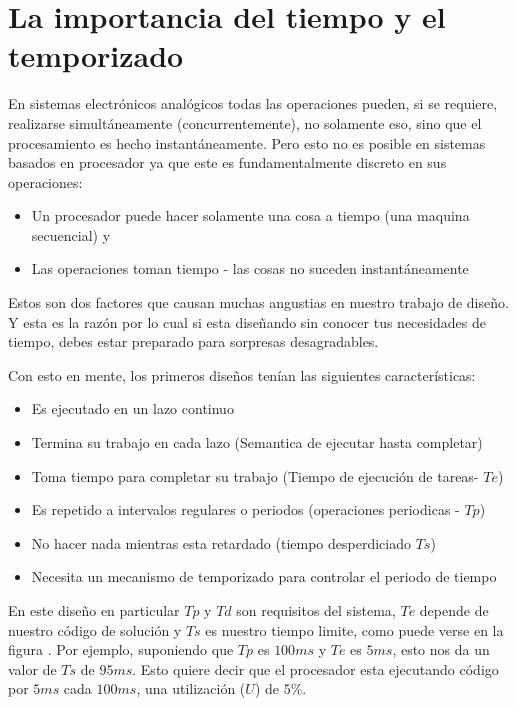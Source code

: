 \documentclass[12pt, twoside]{report}
\begin{document}

\section{La importancia del tiempo y el temporizado}
En sistemas electrónicos analógicos todas las operaciones pueden, si se requiere, realizarse simultáneamente (concurrentemente), no solamente eso, sino que el procesamiento es hecho instantáneamente. Pero esto no es posible en sistemas basados en procesador ya que este es fundamentalmente discreto en sus operaciones:

\begin{itemize}
	\item Un procesador puede hacer solamente una cosa a tiempo (una maquina secuencial) y
	\item Las operaciones toman tiempo - las cosas no suceden instantáneamente
\end{itemize}

Estos son dos factores que causan muchas angustias en nuestro trabajo de diseño. Y esta es la razón por lo cual si esta diseñando sin conocer tus necesidades de tiempo, debes estar preparado para sorpresas desagradables.

Con esto en mente, los primeros diseños tenían las siguientes características:
\begin{itemize}
	\item Es ejecutado en un lazo continuo
	\item Termina su trabajo en cada lazo (Semantica de ejecutar hasta completar)
	\item Toma tiempo para completar su trabajo (Tiempo de ejecución de tareas- $Te$)
	\item Es repetido a intervalos regulares o periodos (operaciones periodicas - $Tp$)
	\item No hacer nada mientras esta retardado (tiempo desperdiciado $Ts$)
	\item Necesita un mecanismo de temporizado para controlar el periodo de tiempo 
\end{itemize}

En este diseño en particular $Tp$ y $Td$ son requisitos del sistema, $Te$ depende de nuestro código de solución y $Ts$ es nuestro tiempo limite, como puede verse en la figura . Por ejemplo, suponiendo que $Tp$ es $100ms$ y $Te$ es $5ms$, esto nos da un valor de $Ts$ de $95ms$. Esto quiere decir que el procesador esta ejecutando código por $5ms$ cada $100ms$, una utilización ($U$) de $5$\%. 
\end{document}
